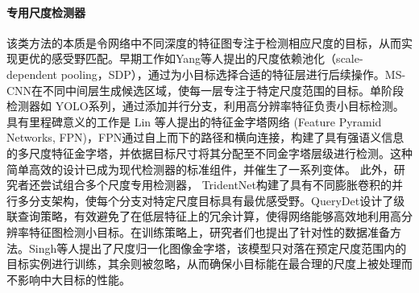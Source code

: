\paragraph{专用尺度检测器}
该类方法的本质是令网络中不同深度的特征图专注于检测相应尺度的目标，从而实现更优的感受野匹配。早期工作如Yang等人\cite{Yang2016Exploit}提出的尺度依赖池化（scale-dependent pooling，SDP），通过为小目标选择合适的特征层进行后续操作。MS-CNN\cite{Cai2016MultiScale}在不同中间层生成候选区域，使每一层专注于特定尺度范围的目标。单阶段检测器如 YOLO系列\cite{redmon2018yolov3}，通过添加并行分支，利用高分辨率特征负责小目标检测。具有里程碑意义的工作是 Lin 等人\cite{FPN}提出的特征金字塔网络 (Feature Pyramid Networks, FPN)，FPN通过自上而下的路径和横向连接，构建了具有强语义信息的多尺度特征金字塔，并依据目标尺寸将其分配至不同金字塔层级进行检测。这种简单高效的设计已成为现代检测器的标准组件，并催生了一系列变体。
此外，研究者还尝试组合多个尺度专用检测器，
TridentNet\cite{li2019scale}构建了具有不同膨胀卷积的并行多分支架构，使每个分支对特定尺度目标具有最优感受野。QueryDet\cite{Yang2022QueryDet}设计了级联查询策略，有效避免了在低层特征上的冗余计算，使得网络能够高效地利用高分辨率特征图检测小目标。在训练策略上，研究者们也提出了针对性的数据准备方法。Singh等人\cite{Singh2017SNIP}提出了尺度归一化图像金字塔，该模型只对落在预定尺度范围内的目标实例进行训练，其余则被忽略，从而确保小目标能在最合理的尺度上被处理而不影响中大目标的性能。



